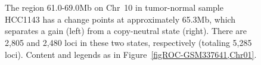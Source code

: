 \documentclass{bioinfo}
\begin{document}
\begin{figure}[!tpbh]
\begin{center}
  \\
  \\
\end{center}
 \caption{
  The region 61.0-69.0Mb on Chr~10 in tumor-normal sample HCC1143 has a change points at approximately 65.3Mb, which separates a gain (left) from a copy-neutral state (right).  There are 2,805 and 2,480 loci in these two states, respectively (totaling 5,285 loci).
  Content and legends as in Figure~\ref{figROC-GSM337641,Chr01}.
 }
 \label{figROC-GSM337641,Chr10}
\end{figure} 


\end{document}
